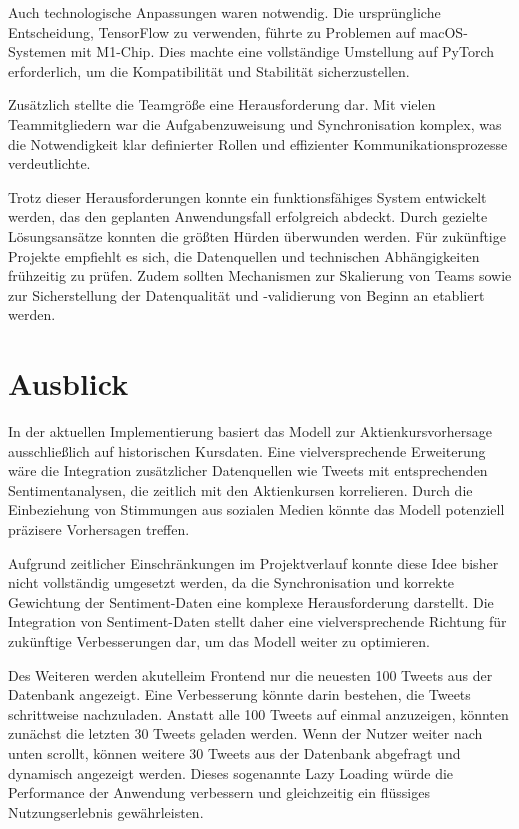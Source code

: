 \documentclass[conference,a4paper,flushend]{cs-techrep}
\begin{document}
Auch technologische Anpassungen waren notwendig. Die ursprüngliche Entscheidung, TensorFlow zu verwenden, führte zu Problemen auf macOS-Systemen mit M1-Chip. Dies machte eine vollständige Umstellung auf PyTorch erforderlich, um die Kompatibilität und Stabilität sicherzustellen.

Zusätzlich stellte die Teamgröße eine Herausforderung dar. Mit vielen Teammitgliedern war die Aufgabenzuweisung und Synchronisation komplex, was die Notwendigkeit klar definierter Rollen und effizienter Kommunikationsprozesse verdeutlichte.

Trotz dieser Herausforderungen konnte ein funktionsfähiges System entwickelt werden, das den geplanten Anwendungsfall erfolgreich abdeckt. Durch gezielte Lösungsansätze konnten die größten Hürden überwunden werden. Für zukünftige Projekte empfiehlt es sich, die Datenquellen und technischen Abhängigkeiten frühzeitig zu prüfen. Zudem sollten Mechanismen zur Skalierung von Teams sowie zur Sicherstellung der Datenqualität und -validierung von Beginn an etabliert werden.


\section{Ausblick}
In der aktuellen Implementierung basiert das Modell zur Aktienkursvorhersage ausschließlich auf historischen Kursdaten. Eine vielversprechende Erweiterung wäre die Integration zusätzlicher Datenquellen wie Tweets mit entsprechenden Sentimentanalysen, die zeitlich mit den Aktienkursen korrelieren. Durch die Einbeziehung von Stimmungen aus sozialen Medien könnte das Modell potenziell präzisere Vorhersagen treffen.

Aufgrund zeitlicher Einschränkungen im Projektverlauf konnte diese Idee bisher nicht vollständig umgesetzt werden, da die Synchronisation und korrekte Gewichtung der Sentiment-Daten eine komplexe Herausforderung darstellt. Die Integration von Sentiment-Daten stellt daher eine vielversprechende Richtung für zukünftige Verbesserungen dar, um das Modell weiter zu optimieren.

Des Weiteren werden akutelleim Frontend nur die neuesten 100 Tweets aus der Datenbank angezeigt. Eine Verbesserung könnte darin bestehen, die Tweets schrittweise nachzuladen. Anstatt alle 100 Tweets auf einmal anzuzeigen, könnten zunächst die letzten 30 Tweets geladen werden. Wenn der Nutzer weiter nach unten scrollt, können weitere 30 Tweets aus der Datenbank abgefragt und dynamisch angezeigt werden. Dieses sogenannte Lazy Loading würde die Performance der Anwendung verbessern und gleichzeitig ein flüssiges Nutzungserlebnis gewährleisten.


\sloppy
\printbibliography[notcategory=selfref]
\end{document}

